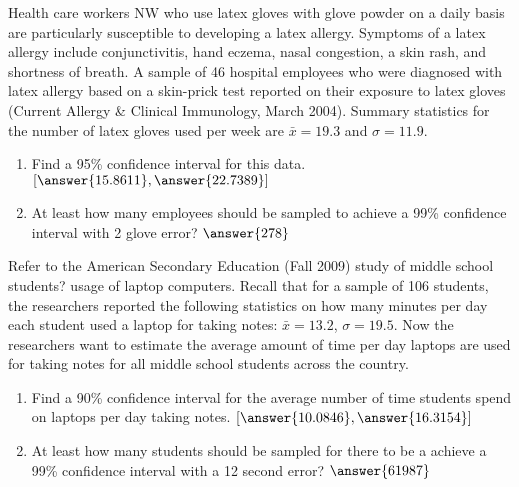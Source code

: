 \documentclass{ximera}
\begin{document}
\begin{problem}
Health care workers NW who use latex gloves with glove powder on a daily basis are particularly susceptible to developing a latex allergy. Symptoms of a latex allergy include conjunctivitis, hand eczema, nasal congestion, a skin rash, and shortness of breath. A sample of 46 hospital employees who were diagnosed with latex allergy based on a skin-prick test reported on their exposure to latex gloves (Current Allergy & Clinical Immunology, March 2004). Summary statistics for the number of latex gloves used per week are $\bar{x} = 19.3$ and $\sigma = 11.9.$

\begin{enumerate}
\item Find a 95\% confidence interval for this data.  $[\answer{15.8611},\answer{22.7389}]$
\item At least how many employees should be sampled to achieve a 99\% confidence interval with 2 glove error? $\answer{278}$
\end{enumerate}

\end{problem}



\begin{problem}
Refer to the American Secondary Education (Fall 2009) study of middle school students? usage of laptop computers. Recall that for a sample of 106 students, the researchers reported the following statistics on how many minutes per day each student used a laptop for taking notes: $\bar{x} = 13.2$, $\sigma = 19.5$. Now the researchers want to estimate the average amount of time per day laptops are used for taking notes for all middle school students across the country.
\begin{enumerate}
\item Find a 90\% confidence interval for the average number of time students spend on laptops per day taking notes. $[\answer{10.0846}, \answer{16.3154}]$
\item At least how many students should be sampled for there to be a achieve a 99\% confidence interval with a 12 second error? $\answer{61987}$
\end{enumerate}


\end{problem}
\end{document}
